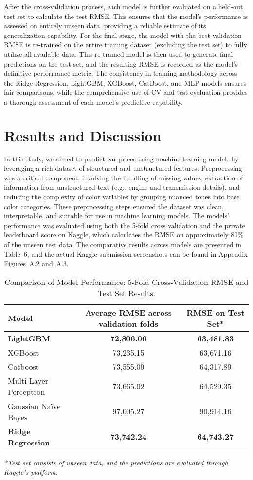 \documentclass{article}
\begin{document}
After the cross-validation process, each model is further evaluated on a held-out test set to calculate the test RMSE. This ensures that the model's performance is assessed on entirely unseen data, providing a reliable estimate of its generalization capability. For the final stage, the model with the best validation RMSE is re-trained on the entire training dataset (excluding the test set) to fully utilize all available data. This re-trained model is then used to generate final predictions on the test set, and the resulting RMSE is recorded as the model's definitive performance metric.  The consistency in training methodology across the Ridge Regression, LightGBM, XGBoost, CatBoost, and MLP models ensures fair comparisons, while the comprehensive use of CV and test evaluation provides a thorough assessment of each model’s predictive capability.

\section{Results and Discussion}

In this study, we aimed to predict car prices using machine learning models by leveraging a rich dataset of structured and unstructured features. Preprocessing was a critical component, involving the handling of missing values, extraction of information from unstructured text (e.g., engine and transmission details), and reducing the complexity of color variables by grouping nuanced tones into base color categories. These preprocessing steps ensured the dataset was clean, interpretable, and suitable for use in machine learning models. The models' performance was evaluated using both the 5-fold cross validation and the private leaderboard score on Kaggle, which calculates the RMSE on approximately 80\% of the unseen test data. The comparative results across models are presented in Table~6, and the actual Kaggle submission screenshots can be found in Appendix Figures~A.2 and~A.3.

\begin{table}[h!]
\centering
\caption{Comparison of Model Performance: 5-Fold Cross-Validation RMSE and Test Set Results.}
\begin{tabular}{lcc}
\toprule
\textbf{Model} & \textbf{Average RMSE across validation folds} & \textbf{RMSE on Test Set*} \\
\midrule
\textbf{LightGBM} & \textbf{72,806.06} & \textbf{63,481.83} \\
XGBoost & 73,235.15 & 63,671.16 \\
Catboost & 73,555.09 & 64,317.89 \\
Multi-Layer Perceptron & 73,665.02 & 64,529.35 \\
Gaussian Na\"{i}ve Bayes & 97,005.27 & 90,914.16 \\
\textbf{Ridge Regression} & \textbf{73,742.24} & \textbf{64,743.27} \\
\bottomrule
\end{tabular}
\begin{flushleft}
\footnotesize{\textit{*Test set consists of unseen data, and the predictions are evaluated through Kaggle's platform.}}
\end{flushleft}
\end{table}
\end{document}
